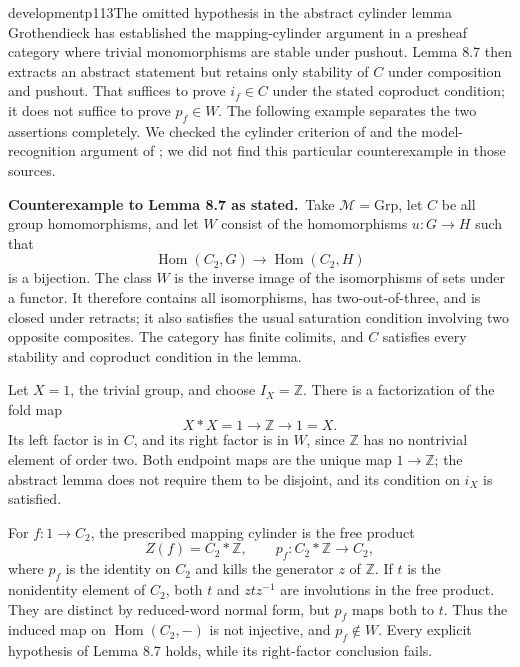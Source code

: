 \begin{dcomment}{development}{p113}{The omitted hypothesis in the abstract cylinder lemma}
Grothendieck has established the mapping-cylinder argument in a presheaf category where trivial monomorphisms are stable under pushout. Lemma 8.7 then extracts an abstract statement but retains only stability of $C$ under composition and pushout. That suffices to prove $i_f\in C$ under the stated coproduct condition; it does not suffice to prove $p_f\in W$. The following example separates the two assertions completely. We checked the cylinder criterion of \citet[Lemma 1.4.13]{Cisinski2006} and the model-recognition argument of \citet[Section 1]{Beke2000}; we did not find this particular counterexample in those sources.

\textbf{Counterexample to Lemma 8.7 as stated.}\ours\ Take $\mathcal M=\mathrm{Grp}$, let $C$ be all group homomorphisms, and let $W$ consist of the homomorphisms $u:G\to H$ such that
\[
 \operatorname{Hom}(C_2,G)\longrightarrow
 \operatorname{Hom}(C_2,H)
\]
is a bijection. The class $W$ is the inverse image of the isomorphisms of sets under a functor. It therefore contains all isomorphisms, has two-out-of-three, and is closed under retracts; it also satisfies the usual saturation condition involving two opposite composites. The category has finite colimits, and $C$ satisfies every stability and coproduct condition in the lemma.

Let $X=1$, the trivial group, and choose $I_X=\mathbb Z$. There is a factorization of the fold map
\[
 X*X=1\longrightarrow\mathbb Z\longrightarrow1=X.
\]
Its left factor is in $C$, and its right factor is in $W$, since $\mathbb Z$ has no nontrivial element of order two. Both endpoint maps are the unique map $1\to\mathbb Z$; the abstract lemma does not require them to be disjoint, and its condition on $i_X$ is satisfied.

For $f:1\to C_2$, the prescribed mapping cylinder is the free product
\[
 Z(f)=C_2*\mathbb Z,
 \qquad p_f:C_2*\mathbb Z\longrightarrow C_2,
\]
where $p_f$ is the identity on $C_2$ and kills the generator $z$ of $\mathbb Z$. If $t$ is the nonidentity element of $C_2$, both $t$ and $ztz^{-1}$ are involutions in the free product. They are distinct by reduced-word normal form, but $p_f$ maps both to $t$. Thus the induced map on $\operatorname{Hom}(C_2,-)$ is not injective, and $p_f\notin W$. Every explicit hypothesis of Lemma 8.7 holds, while its right-factor conclusion fails.


\end{dcomment}
